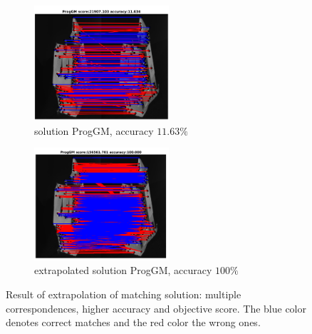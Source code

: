 \begin{figure}[h]\centering
		\begin{subfigure}[b]{0.45\textwidth}
			\centering
			\includegraphics[width=5cm]{"chapter3/fig/HouseSeq2/anchor_descr/using_cpd_afftrafo/solution/fi_1_ProgGM"} 
			\caption{\scriptsize solution ProgGM, accuracy $11.63\%$}
		\end{subfigure} 
		\begin{subfigure}[b]{0.45\textwidth}
			\centering
			\includegraphics[width=5cm]{"chapter3/fig/HouseSeq2/anchor_descr/using_cpd_afftrafo/ext_solution/fi_1_ProgGM"} 
			\caption{\scriptsize extrapolated solution ProgGM, accuracy $100\%$}
		\end{subfigure}
	\caption[Result of the extrapolation of matching solution]{Result of extrapolation of matching solution: multiple correspondences, higher accuracy and objective score. The blue color denotes correct matches and the red color the wrong ones.} \label{fig:sol_ext}
\end{figure}

